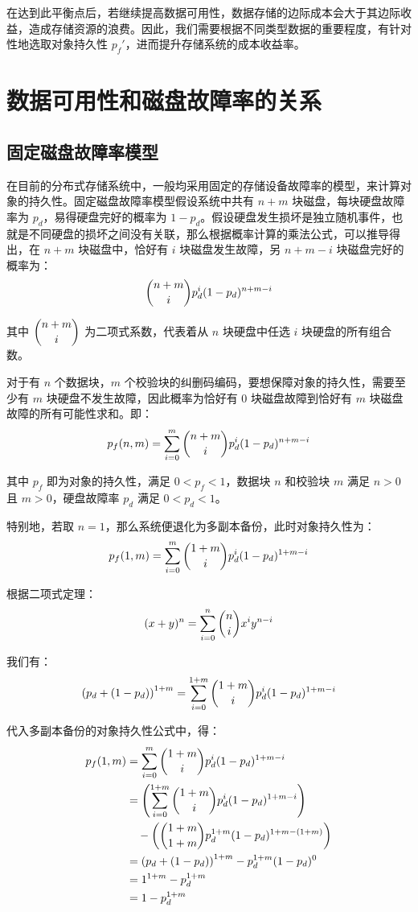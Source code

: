 在达到此平衡点后，若继续提高数据可用性，数据存储的边际成本会大于其边际收益，造成存储资源的浪费。因此，我们需要根据不同类型数据的重要程度，有针对性地选取对象持久性 $p_{f}'$，进而提升存储系统的成本收益率。
\section{数据可用性和磁盘故障率的关系}
\subsection{固定磁盘故障率模型}
在目前的分布式存储系统中，一般均采用固定的存储设备故障率的模型，来计算对象的持久性。固定磁盘故障率模型假设系统中共有 $n+m$ 块磁盘，每块硬盘故障率为 $p_d$，易得硬盘完好的概率为 $1-p_d$。假设硬盘发生损坏是独立随机事件，也就是不同硬盘的损坏之间没有关联，那么根据概率计算的乘法公式，可以推导得出，在 $n+m$ 块磁盘中，恰好有 $i$ 块磁盘发生故障，另 $n+m-i$ 块磁盘完好的概率为：
$$
\dbinom{n+m}{i}p_{d}^{i}(1-p_d)^{n+m-i}
$$

其中 $\dbinom{n+m}{i}$ 为二项式系数，代表着从 $n$ 块硬盘中任选 $i$ 块硬盘的所有组合数。

对于有 $n$ 个数据块，$m$ 个校验块的纠删码编码，要想保障对象的持久性，需要至少有 $m$ 块硬盘不发生故障，因此概率为恰好有 $0$ 块磁盘故障到恰好有 $m$ 块磁盘故障的所有可能性求和。即：
$$
p_{f}(n,m)=\sum_{i=0}^{m}{\dbinom{n+m}{i}p_{d}^{i}(1-p_d)^{n+m-i}}
$$

其中 $p_f$ 即为对象的持久性，满足 $0<p_f<1$，数据块 $n$ 和校验块 $m$ 满足 $n>0$ 且 $m>0$，硬盘故障率 $p_d$ 满足 $0<p_d<1$。

特别地，若取 $n=1$，那么系统便退化为多副本备份，此时对象持久性为：
$$
p_{f}(1,m)=\sum_{i=0}^{m}{\dbinom{1+m}{i}p_{d}^{i}(1-p_d)^{1+m-i}}
$$

根据二项式定理：
$$
(x+y)^n=\sum_{i=0}^{n}{\dbinom{n}{i}x^{i}y^{n-i}}
$$

我们有：
$$
\left(p_d+(1-p_d)\right)^{1+m}=\sum_{i=0}^{1+m}{\dbinom{1+m}{i}p_{d}^{i}(1-p_d)^{1+m-i}}
$$

代入多副本备份的对象持久性公式中，得：
\begin{align*}
p_{f}(1,m)&=\sum_{i=0}^{m}{\dbinom{1+m}{i}p_{d}^{i}(1-p_d)^{1+m-i}}\\
&=\left(\sum_{i=0}^{1+m}{\dbinom{1+m}{i}p_{d}^{i}(1-p_d)^{1+m-i}}\right)\\
&\quad-\left(\dbinom{1+m}{1+m}p_{d}^{1+m}(1-p_d)^{1+m-(1+m)}\right)\\
&=\left(p_d+(1-p_d)\right)^{1+m}-p_{d}^{1+m}(1-p_d)^{0}\\
&=1^{1+m}-p_{d}^{1+m}\\
&=1-p_{d}^{1+m}
\end{align*}

